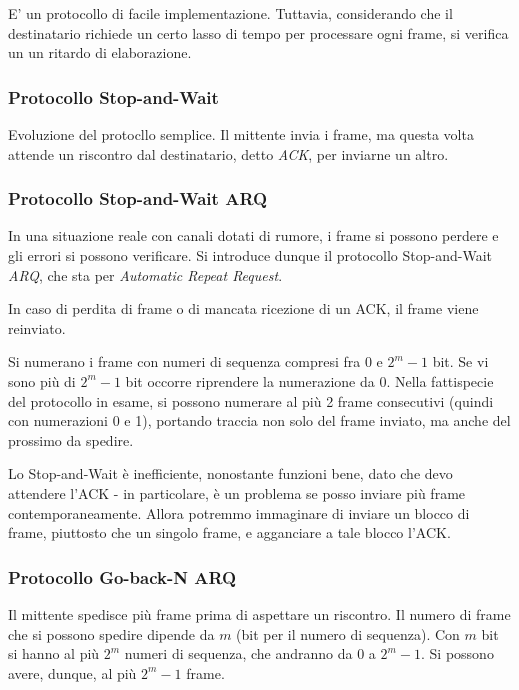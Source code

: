             E' un protocollo di facile implementazione. Tuttavia, considerando che il destinatario richiede un certo lasso di tempo per processare ogni frame, si verifica un un ritardo di elaborazione.
            
        \subsubsection{Protocollo Stop-and-Wait}
            
            Evoluzione del protocllo semplice. Il mittente invia i frame, ma questa volta attende un riscontro dal destinatario, detto \textit{ACK}, per inviarne un altro.
        
        \subsubsection{Protocollo Stop-and-Wait ARQ}
        
            In una situazione reale con canali dotati di rumore, i frame si possono perdere e gli errori si possono verificare. Si introduce dunque il protocollo Stop-and-Wait \textit{ARQ}, che sta per \textit{Automatic Repeat Request}.
            
            In caso di perdita di frame o di mancata ricezione di un ACK, il frame viene reinviato. 
            
            Si numerano i frame con numeri di sequenza compresi fra 0 e $2^m -1$ bit. Se vi sono più di $2^m - 1$ bit occorre riprendere la numerazione da 0. Nella fattispecie del protocollo in esame, si possono numerare al più 2 frame consecutivi (quindi con numerazioni 0 e 1), portando traccia non solo del frame inviato, ma anche del prossimo da spedire.
            
            Lo Stop-and-Wait è inefficiente, nonostante funzioni bene, dato che devo attendere l'ACK - in particolare, è un problema se posso inviare più frame contemporaneamente. Allora potremmo immaginare di inviare un blocco di frame, piuttosto che un singolo frame, e agganciare a tale blocco l'ACK.
        
        \subsubsection{Protocollo Go-back-N ARQ}
        
            Il mittente spedisce più frame prima di aspettare un riscontro. Il numero di frame che si possono spedire dipende da $m$ (bit per il numero di sequenza). Con $m$ bit si hanno al più $2^m$ numeri di sequenza, che andranno da 0 a $2^m -1$. Si possono avere, dunque, al più $2^m - 1$ frame.
            
